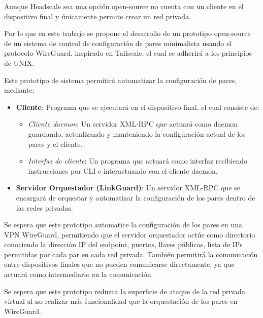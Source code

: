 \documentclass[letterpaper,12pt,oneside]{article}
\begin{document}
Aunque Headscale sea una opción open-source no cuenta con un cliente en el dispositivo final y únicamente permite crear un red privada.

Por lo que en este trabajo se propone el desarrollo de un prototipo open-source de un sistema de control de configuración de pares minimalista usando el protocolo WireGuard, inspirado en Tailscale, el cual se adherirá a los principios de UNIX.

Este prototipo de sistema permitirá automatizar la configuración de pares, mediante:
\begin{itemize}
    \item \textbf{Cliente}: Programa que se ejecutará en el dispositivo final, el cual consiste de:
    \begin{itemize}
        \item \textit{Cliente daemon}: Un servidor XML-RPC que actuará como daemon guardando, actualizando y manteniendo la configuración actual de los pares y el cliente.
        \item \textit{Interfaz de cliente}: Un programa que actuará como interfaz recibiendo instrucciones por CLI e interactuando con el cliente daemon.
    \end{itemize}
    \item \textbf{Servidor Orquestador (LinkGuard)}: Un servidor XML-RPC que se encargará de orquestar y automatizar la configuración de los pares dentro de las redes privadas.
\end{itemize}


Se espera que este prototipo automatice la configuración de los pares en una VPN WireGuard, permitiendo que el servidor orquestador actúe como directorio conociendo la dirección IP del endpoint, puertos, llaves públicas, lista de IPs permitidas por cada par en cada red privada. También permitirá la comunicación entre dispositivos finales que no pueden comunicarse directamente, ya que actuará como intermediario en la comunicación.

Se espera que este prototipo reduzca la superficie de ataque de la red privada virtual al no realizar más funcionalidad que la orquestación de los pares en WireGuard. 
\end{document}
